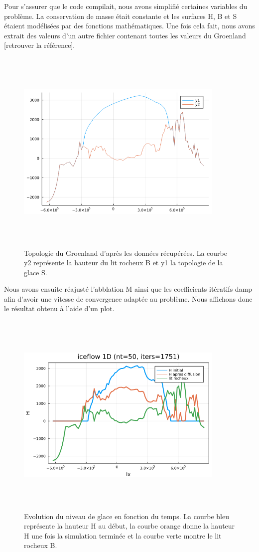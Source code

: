 \documentclass{article}
\begin{document}
Pour s'assurer que le code compilait, nous avons simplifié certaines variables du problème. La conservation de masse était constante et les surfaces H, B et S  étaient modélisées par des fonctions mathématiques. Une fois cela fait, nous avons extrait des valeurs d'un autre fichier contenant toutes les valeurs du Groenland [retrouver la référence].
\begin{figure}[!htpb]
\centering
\includegraphics[width=10cm, keepaspectratio=true, height=10cm]{Groenland.png}
\caption{Topologie du Groenland d'après les données récupérées. La courbe y2 représente la hauteur du lit rocheux B et y1 la topologie de la glace S. }

\end{figure}
\newpage
Nous avons ensuite réajusté l'abblation M ainsi que les coefficients itératifs damp afin d'avoir une vitesse de convergence adaptée au problème.
Nous affichons donc le résultat obtenu à l'aide d'un plot.
\begin{figure}[!htpb]
\centering
\includegraphics[width=10cm, keepaspectratio=true, height=10cm]{Iceflow1D.png}
\caption{Evolution du niveau de glace en fonction du temps. La courbe bleu représente la hauteur H au début, la courbe orange donne la hauteur H une fois la simulation terminée et la courbe verte montre le lit rocheux B.}

\end{figure}
\end{document}
